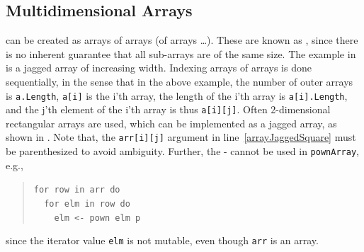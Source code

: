 \documentclass[fsharpNotes.tex]{subfiles}
\begin{document}
\subsection{Multidimensional Arrays}
 can be created as arrays of arrays (of arrays \dots). These are known as , since there is no inherent guarantee that all sub-arrays are of the same size. The example in  is a jagged array of increasing width.
%
%
Indexing arrays of arrays is done sequentially, in the sense that in the above example, the number of outer arrays is \lstinline|a.Length|,  \lstinline|a[i]| is the i'th array, the length of the i'th array is \lstinline|a[i].Length|, and the j'th element of the i'th array is thus \lstinline|a[i][j]|. Often 2-dimensional rectangular arrays are used, which can be implemented as a jagged array, as shown in .
%
%
Note that, the \lstinline{arr[i][j]} argument in line~\ref{arrayJaggedSquare} must be parenthesized to avoid ambiguity. Further, the - cannot be used in \lstinline!pownArray!, e.g., 
\begin{quote} 
  \lstinline{for row in arr do}\\
  \lstinline{  for elm in row do}\\
  \lstinline{    elm <- pown elm p}
 \end{quote}
since the iterator value \lstinline!elm! is not mutable, even though \lstinline!arr! is an array.
\end{document}
